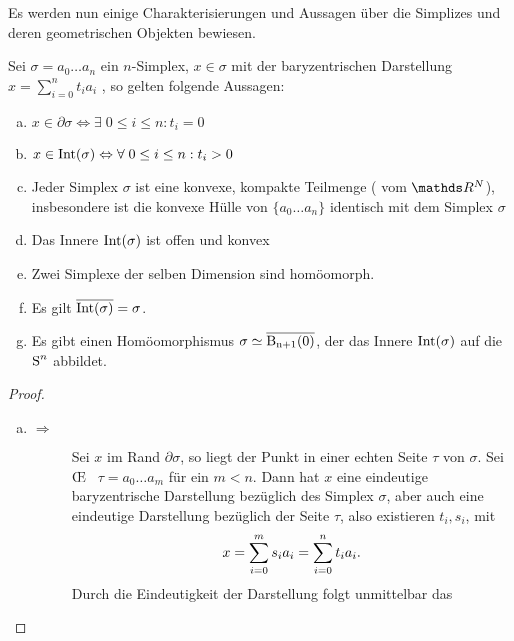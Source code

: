 
Es werden nun einige Charakterisierungen und Aussagen über die
Simplizes und deren geometrischen Objekten bewiesen.

\begin{Satz}
  \normalfont Sei $\sigma = a_0 \ldots a_n $ ein $n$-Simplex,
  $x \in \sigma$ mit der baryzentrischen Darstellung
  $x=\sum\limits_{i=0}^n t_i a_i$ , so gelten folgende Aussagen:
  \begin{enumerate}[(a)]
  \item
    $x \in \partial\sigma \Leftrightarrow \exists \; 0 \leq i \leq n :
    t_i = 0$
  \item \label{satz:a}
    $x \in \Int(\sigma) \Leftrightarrow \forall \; 0 \leq i \leq n :
    t_i > 0$
  \item Jeder Simplex $\sigma$ ist eine konvexe, kompakte Teilmenge (
    vom $\R^N$), insbesondere ist die konvexe Hülle von
    $\{ a_0 \ldots a_n \}$ identisch mit dem Simplex $\sigma$
  \item Das Innere $\Int(\sigma)$ ist offen und konvex
  \item Zwei Simplexe der selben Dimension sind homöomorph.
  \item Es gilt $\overline{\Int(\sigma)} = \sigma$.
  \item Es gibt einen Homöomorphismus $\sigma \simeq \Bn$, der das
    Innere $\Int(\sigma)$ auf die $\Sp^{n}$ abbildet.
  \end{enumerate}
  \begin{proof}
    \begin{enumerate}[a):]
    \item
      \begin{description}
      \item[\glqq $\Rightarrow$\grqq] Sei $x$ im Rand
        $\partial\sigma$, so liegt der Punkt in einer echten Seite
        $\tau$ von $\sigma$. Sei \OE~ $\tau = a_0 \ldots a_m$ für ein
        $m < n$. Dann hat $x$ eine eindeutige baryzentrische
        Darstellung bezüglich des Simplex $\sigma$, aber auch eine
        eindeutige Darstellung bezüglich der Seite $\tau$, also
        existieren $t_i,s_i$, mit
        \begin{gather*}
          x = \sp{0}{m} s_i a_i = \sp{0}{n} t_i a_i .
        \end{gather*}
        Durch die Eindeutigkeit der Darstellung folgt unmittelbar das

\end{description}
\end{enumerate}
\end{proof}
\end{Satz}

